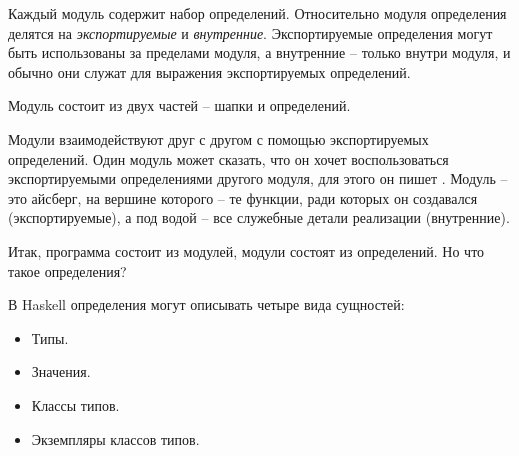 Каждый модуль содержит набор 
определений. Относительно модуля определения делятся на 
\emph{экспортируемые} и \emph{внутренние}. Экспортируемые определения 
могут быть использованы за пределами модуля, а внутренние -- только
внутри модуля, и обычно они служат для выражения экспортируемых определений.

Модуль состоит из двух частей -- шапки и определений.




\smallskip

Модули взаимодействуют друг с другом с помощью экспортируемых определений.
Один модуль может сказать, что он хочет воспользоваться экспортируемыми
определениями другого модуля, для этого он пишет 
. Модуль -- это айсберг, 
на вершине которого -- те функции, ради которых он 
создавался (экспортируемые), а под водой -- все служебные 
детали реализации (внутренние).

Итак, программа состоит из модулей, модули состоят из определений.
Но что такое определения?

В Haskell определения могут описывать четыре вида сущностей:

\begin{itemize}

\item Типы.

\item Значения.

\item Классы типов.

\item Экземпляры классов типов.

\end{itemize}


